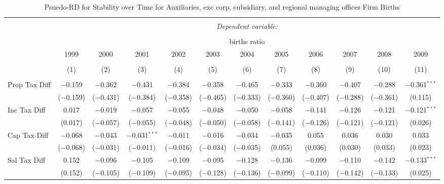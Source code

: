 
\begin{table}[!htbp] \centering 
  \caption{Psuedo-RD for Stability over Time for  Auxiliaries, exc corp, subsidiary, and regional managing offices Firm Births} 
  \label{95year} 
\small 
\begin{tabular}{@{\extracolsep{5pt}}lccccccccccc} 
\\[-1.8ex]\hline 
\hline \\[-1.8ex] 
 & \multicolumn{11}{c}{\textit{Dependent variable:}} \\ 
\cline{2-12} 
\\[-1.8ex] & \multicolumn{11}{c}{births ratio} \\ 
 & 1999 & 2000 & 2001 & 2002 & 2003 & 2004 & 2005 & 2006 & 2007 & 2008 & 2009 \\ 
\\[-1.8ex] & (1) & (2) & (3) & (4) & (5) & (6) & (7) & (8) & (9) & (10) & (11)\\ 
\hline \\[-1.8ex] 
 Prop Tax Diff & $-$0.159 & $-$0.362 & $-$0.431 & $-$0.384 & $-$0.358 & $-$0.465 & $-$0.333 & $-$0.360 & $-$0.407 & $-$0.288 & $-$0.361$^{***}$ \\ 
  & ($-$0.159) & ($-$0.431) & ($-$0.384) & ($-$0.358) & ($-$0.465) & ($-$0.333) & ($-$0.360) & ($-$0.407) & ($-$0.288) & ($-$0.361) & (0.115) \\ 
  Inc Tax Diff & 0.017 & $-$0.019 & $-$0.057 & $-$0.055 & $-$0.048 & $-$0.050 & $-$0.058 & $-$0.141 & $-$0.126 & $-$0.121 & $-$0.121$^{***}$ \\ 
  & (0.017) & ($-$0.057) & ($-$0.055) & ($-$0.048) & ($-$0.050) & ($-$0.058) & ($-$0.141) & ($-$0.126) & ($-$0.121) & ($-$0.121) & (0.026) \\ 
  Cap Tax Diff & $-$0.068 & $-$0.043 & $-$0.031$^{***}$ & $-$0.011 & $-$0.016 & $-$0.034 & $-$0.035 & 0.055 & 0.036 & 0.030 & 0.033 \\ 
  & ($-$0.068) & ($-$0.031) & ($-$0.011) & ($-$0.016) & ($-$0.034) & ($-$0.035) & (0.055) & (0.036) & (0.030) & (0.033) & (0.023) \\ 
  Sal Tax Diff & 0.152 & $-$0.096 & $-$0.105 & $-$0.109 & $-$0.095 & $-$0.128 & $-$0.136 & $-$0.099 & $-$0.110 & $-$0.142 & $-$0.133$^{***}$ \\ 
  & (0.152) & ($-$0.105) & ($-$0.109) & ($-$0.095) & ($-$0.128) & ($-$0.136) & ($-$0.099) & ($-$0.110) & ($-$0.142) & ($-$0.133) & (0.025) \\ 

\end{tabular}
\end{table}
